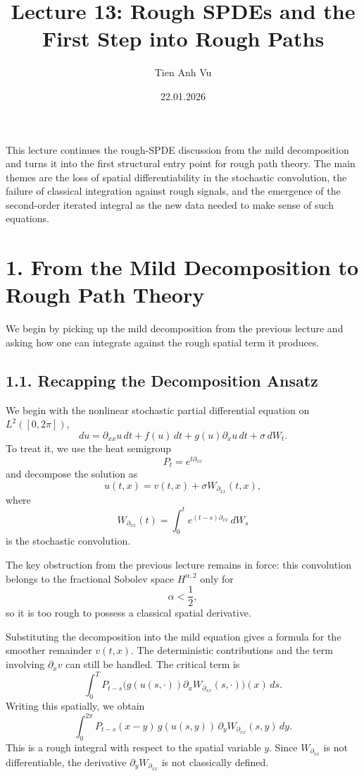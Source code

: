 \documentclass[11pt]{article}
\title{Lecture 13: Rough SPDEs and the First Step into Rough Paths}
\date{22.01.2026}
\author{Tien Anh Vu}
\theoremstyle{definition}
\theoremstyle{remark}
\begin{document}
\maketitle

This lecture continues the rough-SPDE discussion from the mild decomposition and turns it into the first structural entry point for rough path theory. The main themes are the loss of spatial differentiability in the stochastic convolution, the failure of classical integration against rough signals, and the emergence of the second-order iterated integral as the new data needed to make sense of such equations.

\section*{1. From the Mild Decomposition to Rough Path Theory}
We begin by picking up the mild decomposition from the previous lecture and asking how one can integrate against the rough spatial term it produces.

\subsection*{1.1. Recapping the Decomposition Ansatz}
We begin with the nonlinear stochastic partial differential equation on \(L^2([0,2\pi])\),
\[
du=\partial_{xx}u\,dt+f(u)\,dt+g(u)\partial_xu\,dt+\sigma\,dW_t.
\]
To treat it, we use the heat semigroup
\[
P_t=e^{t\partial_{xx}}
\]
and decompose the solution as
\[
u(t,x)=v(t,x)+\sigma W_{\partial_{xx}}(t,x),
\]
where
\[
W_{\partial_{xx}}(t)=\int_0^t e^{(t-s)\partial_{xx}}\,dW_s
\]
is the stochastic convolution.

The key obstruction from the previous lecture remains in force: this convolution belongs to the fractional Sobolev space \(H^{\alpha,2}\) only for
\[
\alpha<\frac12,
\]
so it is too rough to possess a classical spatial derivative.

Substituting the decomposition into the mild equation gives a formula for the smoother remainder \(v(t,x)\). The deterministic contributions and the term involving \(\partial_x v\) can still be handled. The critical term is
\[
\int_0^T P_{t-s}\bigl(g(u(s,\cdot))\partial_x W_{\partial_{xx}}(s,\cdot)\bigr)(x)\,ds.
\]
Writing this spatially, we obtain
\[
\int_0^{2\pi}
P_{t-s}(x-y)\,g(u(s,y))\,\partial_y W_{\partial_{xx}}(s,y)\,dy.
\]
This is a rough integral with respect to the spatial variable \(y\). Since \(W_{\partial_{xx}}\) is not differentiable, the derivative \(\partial_y W_{\partial_{xx}}\) is not classically defined.
\end{document}

